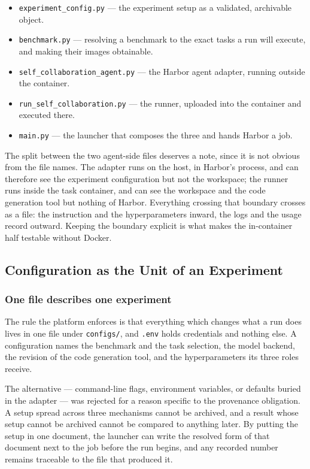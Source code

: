 \begin{itemize}
\item \texttt{experiment\_config.py} --- the experiment setup as a validated,
      archivable object.
\item \texttt{benchmark.py} --- resolving a benchmark to the exact tasks a run
      will execute, and making their images obtainable.
\item \texttt{self\_collaboration\_agent.py} --- the Harbor agent adapter,
      running outside the container.
\item \texttt{run\_self\_collaboration.py} --- the runner, uploaded into the
      container and executed there.
\item \texttt{main.py} --- the launcher that composes the three and hands
      Harbor a job.
\end{itemize}

The split between the two agent-side files deserves a note, since it is not
obvious from the file names. The adapter runs on the host, in Harbor's process,
and can therefore see the experiment configuration but not the workspace; the
runner runs inside the task container, and can see the workspace and the code
generation tool but nothing of Harbor. Everything crossing that boundary
crosses as a file: the instruction and the hyperparameters inward, the logs and
the usage record outward. Keeping the boundary explicit is what makes the
in-container half testable without Docker.

\subsection{Configuration as the Unit of an Experiment}

\subsubsection{One file describes one experiment}

The rule the platform enforces is that everything which changes what a run does
lives in one file under \texttt{configs/}, and \texttt{.env} holds credentials
and nothing else. A configuration names the benchmark and the task selection,
the model backend, the revision of the code generation tool, and the
hyperparameters its three roles receive.

The alternative --- command-line flags, environment variables, or defaults
buried in the adapter --- was rejected for a reason specific to the provenance
obligation. A setup spread across three mechanisms cannot be archived, and a
result whose setup cannot be archived cannot be compared to anything later. By
putting the setup in one document, the launcher can write the resolved form of
that document next to the job before the run begins, and any recorded number
remains traceable to the file that produced it.

